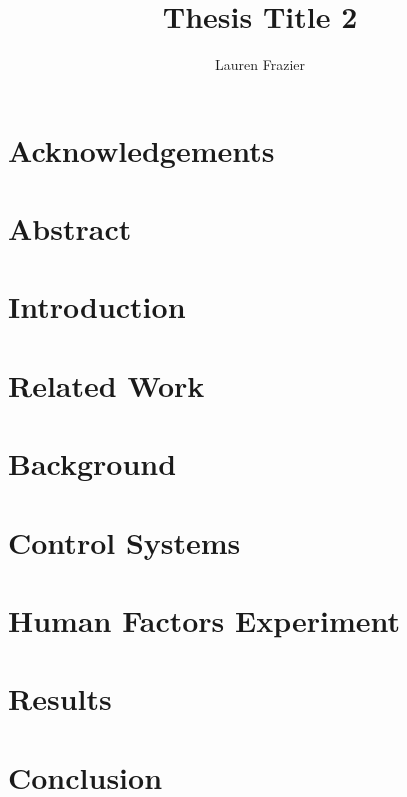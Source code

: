 \documentclass[12pt,a4paper]{report}
\author{Lauren Frazier}
\title{Thesis Title 2}
\begin{document}
\maketitle

\setcounter{page}{1}
\tableofcontents

\chapter*{Acknowledgements}

\chapter*{Abstract}

\chapter{Introduction}
\pagestyle{headings}
\setcounter{page}{1}

\chapter{Related Work}

\chapter{Background}

\chapter{Control Systems}

\chapter{Human Factors Experiment}

\chapter{Results}

\chapter{Conclusion}
\end{document}
